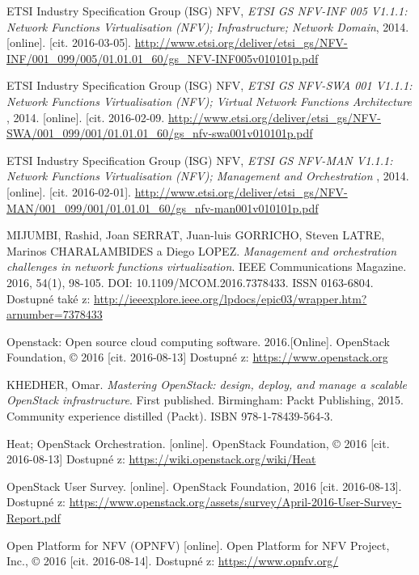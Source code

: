 \begin{thebibliography}{10}
 ETSI Industry Specification Group (ISG) NFV, \emph{ETSI GS NFV-INF 005 V1.1.1: Network Functions Virtualisation (NFV); Infrastructure; Network Domain}, 2014. [online]. [cit. 2016-03-05]. \url{http://www.etsi.org/deliver/etsi_gs/NFV-INF/001_099/005/01.01.01_60/gs_NFV-INF005v010101p.pdf}

 ETSI Industry Specification Group (ISG) NFV, \emph{ETSI GS NFV-SWA 001 V1.1.1: Network Functions Virtualisation (NFV); Virtual Network Functions Architecture  }, 2014. [online]. [cit. 2016-02-09. \url{http://www.etsi.org/deliver/etsi_gs/NFV-SWA/001_099/001/01.01.01_60/gs_nfv-swa001v010101p.pdf}

 ETSI Industry Specification Group (ISG) NFV, \emph{ETSI GS NFV-MAN V1.1.1: Network Functions Virtualisation (NFV);
Management and Orchestration }, 2014. [online]. [cit. 2016-02-01]. \url{http://www.etsi.org/deliver/etsi_gs/NFV-MAN/001_099/001/01.01.01_60/gs_nfv-man001v010101p.pdf}

MIJUMBI, Rashid, Joan SERRAT, Juan-luis GORRICHO, Steven LATRE, Marinos CHARALAMBIDES a Diego LOPEZ. \emph{Management and orchestration challenges in network functions virtualization}. IEEE Communications Magazine. 2016, 54(1), 98-105. DOI: 10.1109/MCOM.2016.7378433. ISSN 0163-6804. Dostupné také z: \url{http://ieeexplore.ieee.org/lpdocs/epic03/wrapper.htm?arnumber=7378433}

 Openstack:  Open  source  cloud  computing  software.  2016.[Online]. OpenStack Foundation, © 2016 [cit. 2016-08-13] Dostupné z: \url{https://www.openstack.org}

 KHEDHER, Omar. \emph{Mastering OpenStack: design, deploy, and manage a scalable OpenStack infrastructure}. First published. Birmingham: Packt Publishing, 2015. Community experience distilled (Packt). ISBN 978-1-78439-564-3.

Heat; OpenStack Orchestration. [online]. OpenStack Foundation, © 2016 [cit. 2016-08-13] Dostupné z: \url{https://wiki.openstack.org/wiki/Heat}

 OpenStack User Survey. [online]. OpenStack Foundation, 2016 [cit. 2016-08-13]. Dostupné z: \url{https://www.openstack.org/assets/survey/April-2016-User-Survey-Report.pdf}

 Open Platform for NFV (OPNFV) [online]. Open Platform for NFV Project, Inc., © 2016 [cit. 2016-08-14]. Dostupné z: \url{https://www.opnfv.org/}


\end{thebibliography}
